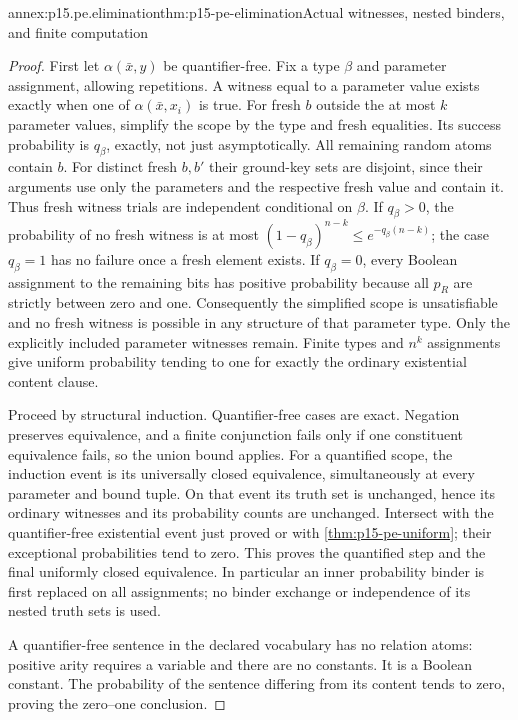 \begin{annexitem}{annex:p15.pe.elimination}{thm:p15-pe-elimination}{Actual witnesses, nested binders, and finite computation}
\begin{proof}
First let \(\alpha(\bar x,y)\) be quantifier-free. Fix a type \(\beta\)
and parameter assignment, allowing repetitions. A witness equal to a
parameter value exists exactly when one of
\(\alpha(\bar x,x_i)\) is true. For fresh \(b\) outside the at most
\(k\) parameter values, simplify the scope by the type and fresh
equalities. Its success probability is \(q_\beta\), exactly, not just
asymptotically. All remaining random atoms contain \(b\). For distinct
fresh \(b,b'\) their ground-key sets are disjoint, since their arguments
use only the parameters and the respective fresh value and contain it.
Thus fresh witness trials are independent conditional on \(\beta\).
If \(q_\beta>0\), the probability of no fresh witness is at most
\((1-q_\beta)^{n-k}\le e^{-q_\beta(n-k)}\); the case \(q_\beta=1\)
has no failure once a fresh element exists.
If \(q_\beta=0\), every Boolean assignment to the remaining bits has
positive probability because all \(p_R\) are strictly between zero
and one. Consequently the simplified scope is unsatisfiable and no
fresh witness is possible in any structure of that parameter type.
Only the explicitly included parameter witnesses remain.
Finite types and \(n^k\) assignments give uniform probability tending
to one for exactly the ordinary existential content clause.

Proceed by structural induction. Quantifier-free cases are exact.
Negation preserves equivalence, and a finite conjunction fails only
if one constituent equivalence fails, so the union bound applies.
For a quantified scope, the induction event is its universally closed
equivalence, simultaneously at every parameter and bound tuple.
On that event its truth set is unchanged, hence its ordinary
witnesses and its probability counts are unchanged. Intersect with
the quantifier-free existential event just proved or with
\cref{thm:p15-pe-uniform}; their exceptional probabilities tend to zero.
This proves the quantified step and the final uniformly closed
equivalence. In particular an inner probability binder is first
replaced on all assignments; no binder exchange or independence of
its nested truth sets is used.

A quantifier-free sentence in the declared vocabulary has no relation
atoms: positive arity requires a variable and there are no constants.
It is a Boolean constant. The probability of the sentence differing
from its content tends to zero, proving the zero--one conclusion.


\end{proof}
\end{annexitem}
